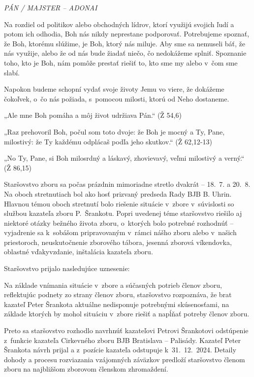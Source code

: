 {\em PÁN / MAJSTER -- ADONAI}


Na rozdiel od politikov alebo obchodných lídrov, ktorí využijú svojich ľudí a potom ich odhodia, Boh nás nikdy neprestane podporovať. Potrebujeme spoznať, že Boh, ktorému slúžime, je Boh, ktorý nás miluje. Aby sme sa nemuseli báť, že nás využije, alebo že od nás bude žiadať niečo, čo nedokážeme splniť. Spoznanie toho, kto je Boh, nám pomôže prestať riešiť to, kto sme my alebo v~čom sme slabí.

Napokon budeme schopní vydať svoje životy Jemu vo viere, že dokážeme čokoľvek, o~čo nás požiada, s~pomocou milosti, ktorú od Neho dostaneme.


„Ale mne Boh pomáha a môj život udržiava Pán.“ (Ž 54,6)

„Raz prehovoril Boh, počul som toto dvoje: že Boh je mocný a Ty, Pane, milostivý: že Ty každému odplácaš podľa jeho skutkov.“ (Ž 62,12-13)

„No Ty, Pane, si Boh milosrdný a láskavý, zhovievavý, veľmi milostivý a verný.“ (Ž 86,15)





Staršovstvo zboru sa počas prázdnin mimoriadne stretlo dvakrát -- 18.~7. a 20.~8. Na oboch stretnutiach bol ako hosť prizvaný predseda Rady BJB B. Uhrin. Hlavnou témou oboch stretnutí bolo riešenie situácie v~zbore v~súvislosti so službou kazateľa zboru P.~Šrankotu. Popri uvedenej téme staršovstvo riešilo aj niektoré otázky bežného života zboru, o~ktorých bolo potrebné rozhodnúť -- vyjadrenie sa k~sobášom pripravovaným v~rámci nášho zboru alebo v~našich priestoroch, neuskutočnenie zborového tábora, jesenná zborová víkendovka, oblastné vďakyvzdanie, inštalácia kazateľa zboru.

Staršovstvo prijalo nasledujúce uznesenie:

Na základe vnímania situácie v~zbore a súčasných potrieb členov zboru, reflektujúc podnety zo strany členov zboru, staršovstvo rozpoznáva, že brat kazateľ Peter Šrankota aktuálne nedisponuje potrebnými skúsenosťami, na základe ktorých by mohol situáciu v~zbore riešiť a napĺňať potreby členov zboru.

Preto sa staršovstvo rozhodlo navrhnúť kazateľovi Petrovi Šrankotovi odstúpenie z~funkcie kazateľa Cirkevného zboru BJB Bratislava -- Palisády. Kazateľ Peter Šrankota návrh prijal a
z~pozície kazateľa odstupuje k~31.~12.~2024. Detaily dohody a procesu rozviazania vzájomných záväzkov predloží staršovstvo členom zboru na najbližšom zborovom členskom zhromaždení.

